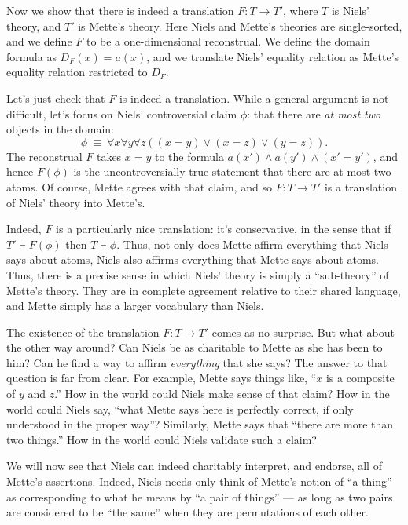 \begin{example}
  Now we show that there is indeed a translation $F:T\to T'$, where
  $T$ is Niels' theory, and $T'$ is Mette's theory.  Here Niels and
  Mette's theories are single-sorted, and we define $F$ to be a
  one-dimensional reconstrual.  We define the domain formula as
  $D_F(x)=a(x)$, and we translate Niels' equality relation as Mette's
  equality relation restricted to $D_F$.

  Let's just check that $F$ is indeed a translation.  While a general
  argument is not difficult, let's focus on Niels' controversial
  claim $\phi$: that there are {\it at most two} objects in the domain: 
  \[ \phi \:\equiv \: \forall x\forall y\forall z((x=y)\vee (x=z)\vee
    (y=z)) .\] The reconstrual $F$ takes $x=y$ to the formula
  $a(x')\wedge a(y')\wedge (x'=y')$, and hence $F(\phi )$ is the
  uncontroversially true statement that there are at most two atoms.
  Of course, Mette agrees with that claim, and so $F:T\to T'$ is a
  translation of Niels' theory into Mette's.

  Indeed, $F$ is a particularly nice translation: it's conservative,
  in the sense that if $T'\vdash F(\phi )$ then $T\vdash \phi$.  Thus,
  not only does Mette affirm everything that Niels says about atoms,
  Niels also affirms everything that Mette says about atoms.  Thus,
  there is a precise sense in which Niels' theory is simply a
  ``sub-theory'' of Mette's theory.  They are in complete agreement
  relative to their shared language, and Mette simply has a larger
  vocabulary than Niels.

  The existence of the translation $F:T\to T'$ comes as no surprise.
  But what about the other way around?  Can Niels be as charitable to
  Mette as she has been to him?  Can he find a way to affirm {\it
    everything} that she says?  The answer to that question is far
  from clear.  For example, Mette says things like, ``$x$ is a
  composite of $y$ and $z$.''  How in the world could Niels make sense
  of that claim?  How in the world could Niels say, ``what Mette says
  here is perfectly correct, if only understood in the proper way''?
  Similarly, Mette says that ``there are more than two things.''  How
  in the world could Niels validate such a claim?

  We will now see that Niels can indeed charitably interpret, and
  endorse, all of Mette's assertions.  Indeed, Niels needs only think
  of Mette's notion of ``a thing'' as corresponding to what he means
  by ``a pair of things'' --- as long as two pairs are considered to
  be ``the same'' when they are permutations of each other.


\end{example}
